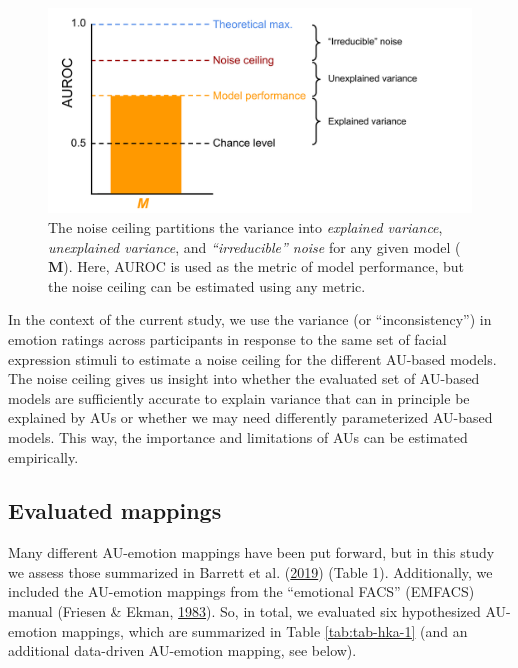 \documentclass[11pt,american,a4paper,oneside,]{memoir} %
\begin{document}
\begin{figure}
\centering
\includegraphics{_bookdown_files/hypothesis-kernel-analysis-files/figures/figure_3.pdf}
\caption{\label{fig:fig-hka-3}The noise ceiling partitions the variance into \emph{explained variance}, \emph{unexplained variance}, and \emph{``irreducible'' noise} for any given model (\(\mathbf{M}\)). Here, AUROC is used as the metric of model performance, but the noise ceiling can be estimated using any metric.}
\end{figure}



In the context of the current study, we use the variance (or ``inconsistency'') in emotion ratings across participants in response to the same set of facial expression stimuli to estimate a noise ceiling for the different AU-based models. The noise ceiling gives us insight into whether the evaluated set of AU-based models are sufficiently accurate to explain variance that can in principle be explained by AUs or whether we may need differently parameterized AU-based models. This way, the importance and limitations of AUs can be estimated empirically.

\hypertarget{evaluated-mappings}{%
\subsection{Evaluated mappings}\label{evaluated-mappings}}

Many different AU-emotion mappings have been put forward, but in this study we assess those summarized in Barrett et al. (\protect\hyperlink{ref-Barrett2019-bc}{2019}) (Table 1). Additionally, we included the AU-emotion mappings from the ``emotional FACS'' (EMFACS) manual (Friesen \& Ekman, \protect\hyperlink{ref-Friesen1983-ft}{1983}). So, in total, we evaluated six hypothesized AU-emotion mappings, which are summarized in Table \ref{tab:tab-hka-1} (and an additional data-driven AU-emotion mapping, see below).
\end{document}
